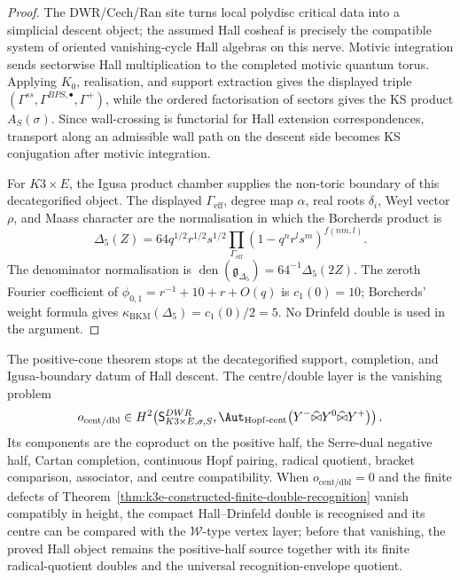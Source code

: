 \begin{proof}
The DWR/Cech/Ran site turns local polydisc critical data into a
simplicial descent object; the assumed Hall cosheaf is precisely the
compatible system of oriented vanishing-cycle Hall algebras on this
nerve. Motivic integration sends sectorwise Hall multiplication to the
completed motivic quantum torus. Applying \(K_0\), realisation, and
support extraction gives the displayed triple
\((\Gamma^{ss},\Gamma^{BPS,\bullet},\Gamma^+)\), while the ordered
factorisation of sectors gives the KS product \(A_S(\sigma)\). Since
wall-crossing is functorial for Hall extension correspondences,
transport along an admissible wall path on the descent side becomes KS
conjugation after motivic integration.

For \(K3\times E\), the Igusa product chamber supplies the non-toric
boundary of this decategorified object. The displayed
\(\Gamma_{\mathrm{eff}}\), degree map \(\alpha\), real roots
\(\delta_i\), Weyl vector \(\rho\), and Maass character are the
normalisation in which the Borcherds product is
\[
 \Delta_5(Z)=
 64q^{1/2}r^{1/2}s^{1/2}
 \prod_{\Gamma_{\mathrm{eff}}}(1-q^nr^ls^m)^{f(nm,l)}.
\]
The denominator normalisation is
\(\operatorname{den}(\mathfrak g_{\Delta_5})=64^{-1}\Delta_5(2Z)\).
The zeroth Fourier coefficient of
\(\phi_{0,1}=r^{-1}+10+r+O(q)\) is \(c_1(0)=10\); Borcherds'
weight formula gives
	\(\kappa_{\mathrm{BKM}}(\Delta_5)=c_1(0)/2=5\).
No Drinfeld double is used in the argument.
\end{proof}

\begin{remark}
\label{gluing:rem:positive-cone-descent-index-limits}
The positive-cone theorem stops at the decategorified support,
completion, and Igusa-boundary datum of Hall descent. The centre/double
layer is the vanishing problem
\[
 o_{\mathrm{cent/dbl}}\in
 H^2\!\left(
 \mathsf S^{DWR}_{K3\times E,\sigma,S},
 \Aut_{\mathrm{Hopf}\text{-}\mathrm{cent}}
 \bigl(Y^{-}\widehat\bowtie Y^{0}\widehat\bowtie Y^{+}\bigr)
 \right).
\]
Its components are the coproduct on the positive half, the
Serre-dual negative half, Cartan completion, continuous Hopf pairing,
radical quotient, bracket comparison, associator, and centre
compatibility. When \(o_{\mathrm{cent/dbl}}=0\) and the finite defects
of Theorem~\ref{thm:k3e-constructed-finite-double-recognition} vanish
compatibly in height, the compact Hall--Drinfeld double is recognised
and its centre can be compared with the \(\mathcal W\)-type vertex
layer; before that vanishing, the proved Hall object remains the
positive-half source together with its finite radical-quotient doubles
and the universal recognition-envelope quotient.
\end{remark}

